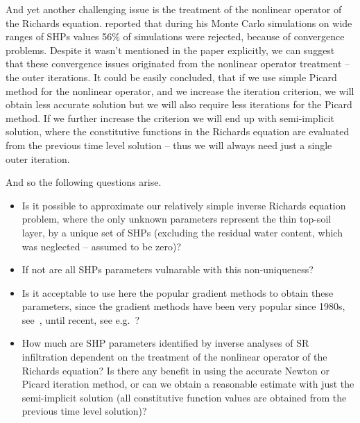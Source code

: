 \documentclass[review]{myarticle}
\begin{document}
And yet another challenging issue is the treatment of the nonlinear operator of the Richards equation. \cite{beven2003-uncertain} reported that during his Monte Carlo simulations on wide ranges of SHPs values 56\% of simulations were rejected, because of convergence problems. 
Despite it wasn't mentioned in the paper explicitly, we can suggest that these convergence issues originated from the nonlinear operator treatment -- the outer iterations.
It could be easily concluded, that if we use simple Picard method for the nonlinear operator, and we increase the iteration criterion, we will obtain less accurate solution but we will also require less iterations for the Picard method. If we further increase the criterion we will end up with semi-implicit solution, where the constitutive functions in the Richards equation are evaluated from the previous time level solution -- thus we will always need just a single outer iteration.



And so the following questions arise. 
\begin{itemize}
\item Is it possible to approximate our relatively simple inverse Richards equation problem, where the only unknown parameters represent the thin top-soil layer, by a unique set of SHPs (excluding the residual water content, which was neglected -- assumed to be zero)?
\item If not are all SHPs parameters vulnarable with this non-uniqueness?
\item Is it acceptable to use here the popular gradient methods to obtain these parameters, since the gradient methods have been very popular since 1980s, see~\citep{vangen-old}, until recent, see e.g.~\citep{rezaei, Verbist2010, Ventrella, Simunek2}?
\item How much are SHP parameters identified by inverse analyses of SR infiltration dependent on the treatment of the nonlinear operator of the Richards equation? Is there any benefit in using the accurate Newton or Picard iteration method, or can we obtain a reasonable estimate with just the semi-implicit solution (all constitutive function values are obtained from the previous time level solution)?
\end{itemize}
\end{document}
